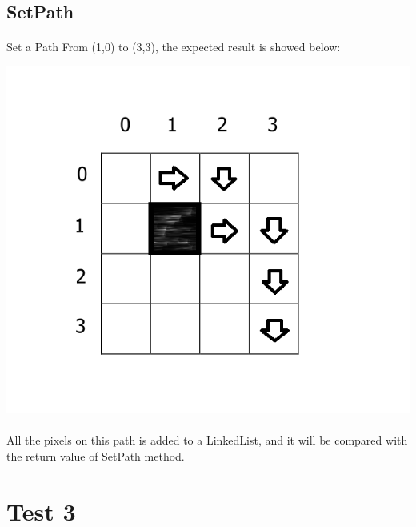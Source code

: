 \documentclass[11pt, a4paper]{report}
\begin{document}
\subsection{SetPath}
\paragraph{}Set a Path From (1,0) to (3,3), the expected result is showed below:\\
\begin{center}
\includegraphics[scale=0.4]{./image/Test2SetPath.png}
\end{center}
\paragraph{}All the pixels on this path is added to a LinkedList, and it will be compared with the return value of SetPath method.



\section{Test 3}
\end{document}
